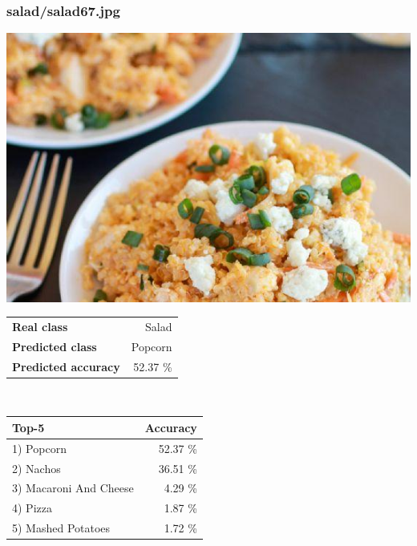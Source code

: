 \subsubsection{salad/salad67.jpg}

\begin{minipage}[t]{0.4\textwidth}
	\vspace{0pt}
	\includegraphics[width=\linewidth]{images/evaluation-images/salad/salad67.jpg}
\end{minipage}
\hfill
\begin{minipage}[t]{0.5\textwidth}
	\vspace{0pt}\raggedright
	\begin{tabularx}{\textwidth}{X r}
		\small \textbf{Real class} & \small Salad\\
		\small \textbf{Predicted class} & \small Popcorn\\
		\small \textbf{Predicted accuracy} & \small 52.37 \%
    \end{tabularx}\\
    
    \vspace{6pt}
	\begin{tabularx}{\textwidth}{X r}
        \small \textbf{Top-5} & \small \textbf{Accuracy} \\
        \hline
		\small 1) Popcorn & \small 52.37 \%\\\small 2) Nachos & \small 36.51 \%\\\small 3) Macaroni And Cheese & \small 4.29 \%\\\small 4) Pizza & \small 1.87 \%\\\small 5) Mashed Potatoes & \small 1.72 \%
    \end{tabularx}
\end{minipage}
    
